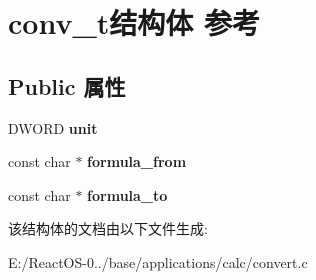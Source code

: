\hypertarget{structconv__t}{}\section{conv\+\_\+t结构体 参考}
\label{structconv__t}
\subsection*{Public 属性}
\begin{DoxyCompactItemize}
\item 
\mbox{\label{structconv__t_a2a27d945a71d2985ae6fb9ca256ebe07}} 
D\+W\+O\+RD {\bfseries unit}
\item 
\mbox{\label{structconv__t_a95d34dfd766855e535064051079407af}} 
const char $\ast$ {\bfseries formula\+\_\+from}
\item 
\mbox{\label{structconv__t_a29377f8650da451a29c8272f012be71e}} 
const char $\ast$ {\bfseries formula\+\_\+to}
\end{DoxyCompactItemize}


该结构体的文档由以下文件生成\+:\begin{DoxyCompactItemize}
\item 
E\+:/\+React\+O\+S-\/0../base/applications/calc/convert.\+c\end{DoxyCompactItemize}
